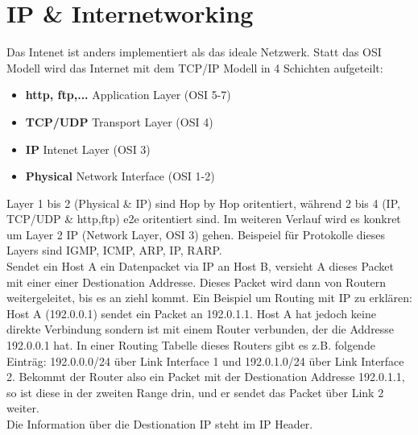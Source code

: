 \section{IP \& Internetworking}
	Das Intenet ist anders implementiert als das ideale Netzwerk. Statt das OSI Modell wird das Internet mit dem TCP/IP Modell in 4 Schichten aufgeteilt:
	\begin{itemize}
		\item \textbf{http, ftp,...} Application Layer (OSI 5-7)
		\item \textbf{TCP/UDP} Transport Layer (OSI 4)
		\item \textbf{IP} Intenet Layer (OSI 3)
		\item \textbf{Physical} Network Interface (OSI 1-2)
	\end{itemize}
	Layer 1 bis 2 (Physical \& IP) sind Hop by Hop oritentiert, während 2 bis 4 (IP, TCP/UDP \& http,ftp) e2e oritentiert sind. Im weiteren Verlauf wird es konkret um Layer 2 IP (Network Layer, OSI 3) gehen. Beispeiel für Protokolle dieses Layers sind IGMP, ICMP, ARP, IP, RARP. \\
	Sendet ein Host A ein Datenpacket via IP an Host B, versieht A dieses Packet mit einer einer Destionation Addresse. Dieses Packet wird dann von Routern weitergeleitet, bis es an ziehl kommt.  Ein Beispiel um Routing mit IP zu erklären: \\ Host A (192.0.0.1) sendet ein Packet an 192.0.1.1. Host A hat jedoch keine direkte Verbindung sondern ist mit einem Router verbunden, der die Addresse 192.0.0.1 hat. In einer Routing Tabelle dieses Routers gibt es z.B. folgende Einträg: 192.0.0.0/24  über Link Interface 1 und 192.0.1.0/24 über Link Interface 2. Bekommt der Router also ein Packet mit der Destionation Addresse 192.0.1.1, so ist diese in der zweiten Range drin, und er sendet das Packet über Link 2 weiter. \\ Die Information über die Destionation IP steht im IP Header.

